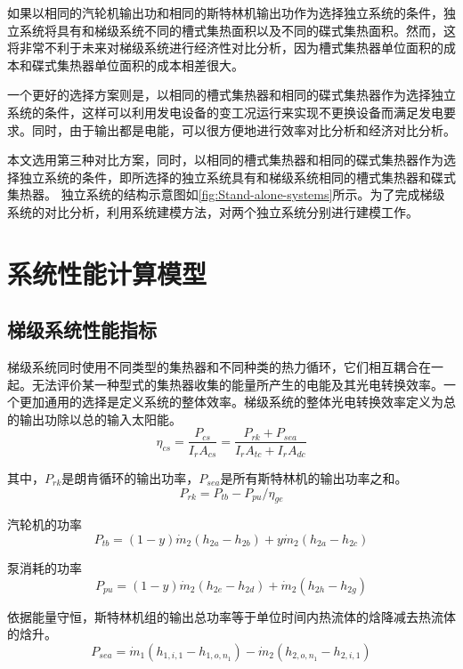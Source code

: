 	如果以相同的汽轮机输出功和相同的斯特林机输出功作为选择独立系统的条件，独立系统将具有和梯级系统不同的槽式集热面积以及不同的碟式集热面积。然而，这将非常不利于未来对梯级系统进行经济性对比分析，因为槽式集热器单位面积的成本和碟式集热器单位面积的成本相差很大。
	
	一个更好的选择方案则是，以相同的槽式集热器和相同的碟式集热器作为选择独立系统的条件，这样可以利用发电设备的变工况运行来实现不更换设备而满足发电要求。同时，由于输出都是电能，可以很方便地进行效率对比分析和经济对比分析。

本文选用第三种对比方案，同时，以相同的槽式集热器和相同的碟式集热器作为选择独立系统的条件，即所选择的独立系统具有和梯级系统相同的槽式集热器和碟式集热器。
独立系统的结构示意图如\autoref{fig:Stand-alone-systems}所示。为了完成梯级系统的对比分析，利用系统建模方法，对两个独立系统分别进行建模工作。

\section{系统性能计算模型}
\subsection{梯级系统性能指标}

梯级系统同时使用不同类型的集热器和不同种类的热力循环，它们相互耦合在一起。无法评价某一种型式的集热器收集的能量所产生的电能及其光电转换效率。一个更加通用的选择是定义系统的整体效率。梯级系统的整体光电转换效率定义为总的输出功除以总的输入太阳能。
\begin{equation}
	\eta_{cs}=\dfrac{P_{cs}}{I_rA_{cs}} = \dfrac{P_{rk}+ P_{sea}}{I_rA_{tc} + I_rA_{dc}}
\end{equation}

其中，$P_{rk}$是朗肯循环的输出功率，$P_{sea}$是所有斯特林机的输出功率之和。
\begin{equation}
	P_{rk} = P_{tb} - P_{pu} / \eta_{ge}
\end{equation}

汽轮机的功率
\begin{equation}
  P_{tb}=\left(1-y\right)\dot{m}_{2}\left(h_{2a}-h_{2b}\right)+y\dot{m}_{2}\left(h_{2a}-h_{2c}\right)
\end{equation}

泵消耗的功率
\begin{equation}
	P_{pu}=\left(1-y\right)\dot{m}_{2}\left(h_{2e}-h_{2d}\right)+\dot{m}_{2}\left(h_{2h}-h_{2g}\right)
\end{equation}

依据能量守恒，斯特林机组的输出总功率等于单位时间内热流体的焓降减去热流体的焓升。
\begin{equation}
	P_{sea}=\dot{m}_1(h_{1,i,1} - h_{1,o,n_1}) - \dot{m}_2(h_{2,o,n_1} - h_{2,i,1})
\end{equation}

